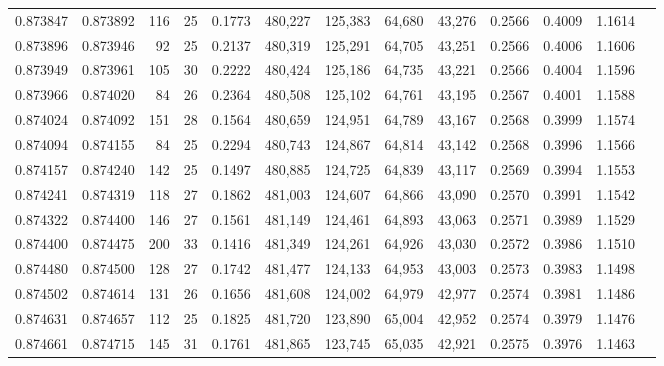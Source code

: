 \begin{tabular}{rrrrrrrrrrrrr}
0.873847 & 0.873892 &   116 &  25 &                                     0.1773 & 480,227 & 125,383 &  64,680 &  43,276 & 0.2566 & 0.4009 & 1.1614 \\
0.873896 & 0.873946 &    92 &  25 &                                     0.2137 & 480,319 & 125,291 &  64,705 &  43,251 & 0.2566 & 0.4006 & 1.1606 \\
0.873949 & 0.873961 &   105 &  30 &                                     0.2222 & 480,424 & 125,186 &  64,735 &  43,221 & 0.2566 & 0.4004 & 1.1596 \\
0.873966 & 0.874020 &    84 &  26 &                                     0.2364 & 480,508 & 125,102 &  64,761 &  43,195 & 0.2567 & 0.4001 & 1.1588 \\
0.874024 & 0.874092 &   151 &  28 &                                     0.1564 & 480,659 & 124,951 &  64,789 &  43,167 & 0.2568 & 0.3999 & 1.1574 \\
0.874094 & 0.874155 &    84 &  25 &                                     0.2294 & 480,743 & 124,867 &  64,814 &  43,142 & 0.2568 & 0.3996 & 1.1566 \\
0.874157 & 0.874240 &   142 &  25 &                                     0.1497 & 480,885 & 124,725 &  64,839 &  43,117 & 0.2569 & 0.3994 & 1.1553 \\
0.874241 & 0.874319 &   118 &  27 &                                     0.1862 & 481,003 & 124,607 &  64,866 &  43,090 & 0.2570 & 0.3991 & 1.1542 \\
0.874322 & 0.874400 &   146 &  27 &                                     0.1561 & 481,149 & 124,461 &  64,893 &  43,063 & 0.2571 & 0.3989 & 1.1529 \\
0.874400 & 0.874475 &   200 &  33 &                                     0.1416 & 481,349 & 124,261 &  64,926 &  43,030 & 0.2572 & 0.3986 & 1.1510 \\
0.874480 & 0.874500 &   128 &  27 &                                     0.1742 & 481,477 & 124,133 &  64,953 &  43,003 & 0.2573 & 0.3983 & 1.1498 \\
0.874502 & 0.874614 &   131 &  26 &                                     0.1656 & 481,608 & 124,002 &  64,979 &  42,977 & 0.2574 & 0.3981 & 1.1486 \\
0.874631 & 0.874657 &   112 &  25 &                                     0.1825 & 481,720 & 123,890 &  65,004 &  42,952 & 0.2574 & 0.3979 & 1.1476 \\
0.874661 & 0.874715 &   145 &  31 &                                     0.1761 & 481,865 & 123,745 &  65,035 &  42,921 & 0.2575 & 0.3976 & 1.1463 \\

\end{tabular}
